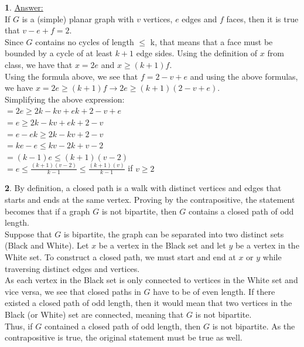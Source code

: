 \documentclass[12pt,a4paper]{article}
\theoremstyle{definition}
\newtheorem{problem}{}
\begin{document}
\begin{problem} \underline{Answer: } \\
If $G$ is a (simple) planar graph with $v$ vertices, $e$ edges and $f$ faces, then it is true that $v - e + f = 2$. \\

Since $G$ contains no cycles of length $\leq$ k, that means that a face must be bounded by a cycle of at least $k + 1$ edge sides. Using the definition of $x$ from class, we have that $x = 2e$ and $x \geq (k + 1)f$. \\

Using the formula above, we see that $f = 2 - v + e$ and using the above formulas, we have $x = 2e \geq (k + 1)f \rightarrow 2e \geq (k + 1)(2 - v + e)$. \\

Simplifying the above expression: \\
$= 2e \geq 2k - kv + ek + 2 - v + e$ \\
$= e \geq 2k - kv + ek + 2 - v$ \\
$= e - ek \geq 2k - kv + 2 - v$ \\
$= ke - e \leq kv - 2k + v - 2$ \\
$= (k - 1)e \leq (k + 1)(v - 2)$ \\
$= e \leq \frac{(k + 1)(v - 2)}{k - 1} \leq \frac{(k + 1)(v)}{k - 1}$ if $v \geq 2$\\

\end{problem}

\begin{problem}

By definition, a closed path is a walk with distinct vertices and edges that starts and ends at the same vertex. Proving by the contrapositive, the statement becomes that if a graph $G$ is not bipartite, then $G$ contains a closed path of odd length. \\

Suppose that $G$ is bipartite, the graph can be separated into two distinct sets (Black and White). Let $x$ be a vertex in the Black set and let $y$ be a vertex in the White set. To construct a closed path, we must start and end at $x$ or $y$ while traversing distinct edges and vertices. \\

As each vertex in the Black set is only connected to vertices in the White set and vice versa, we see that closed paths in $G$ have to be of even length. If there existed a closed path of odd length, then it would mean that two vertices in the Black (or White) set are connected, meaning that $G$ is not bipartite. \\

Thus, if $G$ contained a closed path of odd length, then $G$ is not bipartite. As the contrapositive is true, the original statement must be true as well.

\end{problem}
\end{document}
